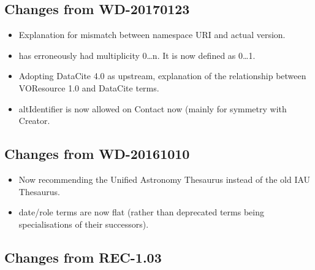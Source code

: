 \documentclass[11pt,a4paper]{ivoa}
\begin{document}
\subsection{Changes from WD-20170123}

\begin{itemize}
\item Explanation for mismatch between namespace URI and actual version.
\item {} has erroneously had multiplicity 0\dots n.
It is now defined as 0\dots 1.
\item Adopting DataCite 4.0 as upstream, explanation of the relationship
between VOResource 1.0 and DataCite terms.
\item altIdentifier is now allowed on Contact now (mainly for symmetry
with Creator.
\end{itemize}

\subsection{Changes from WD-20161010}

\begin{itemize}
\item Now recommending the Unified Astronomy Thesaurus instead of the
old IAU Thesaurus.
\item date/role terms are now flat (rather than deprecated terms being
specialisations of their successors).
\end{itemize}

\subsection{Changes from REC-1.03}
\end{document}
